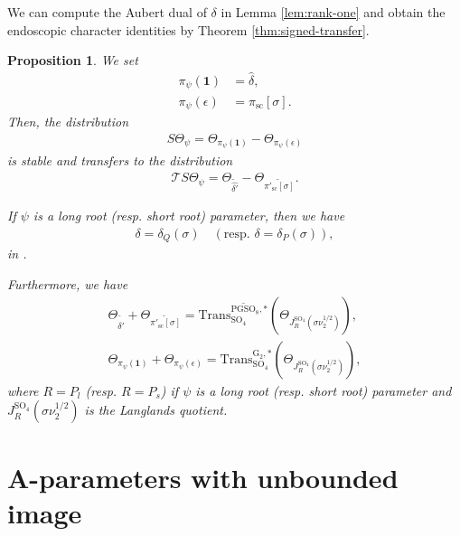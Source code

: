 \documentclass[12pt]{amsart}
\theoremstyle{definition}
\theoremstyle{plain}
\newtheorem{proposition}[definition]{Proposition}
\theoremstyle{remark}
\def\SO{\mathrm{SO}}
\def\PGSO{\mathrm{PGSO}}
\newcommand{\cT}{\mathcal{T}}
\numberwithin{equation}{section}
\newcommand{\rG}{\mathrm{G}}
\newcommand{\Trans}{\mathrm{Trans}}
\begin{document}
We can compute the Aubert dual of $\delta$ in Lemma \ref{lem:rank-one} and obtain the endoscopic character identities by Theorem \ref{thm:signed-transfer}.


\begin{proposition}\label{prop:co-tempered-long-short-ecr}
      We set 
      \begin{align*}
            \pi_{\psi}(\mathbf{1}) &= \widehat{\delta}, \\
            \pi_{\psi}(\epsilon) &= \pi_{\mathrm{sc}}[\sigma].
      \end{align*}
      Then, the distribution
      \begin{align*}
            S\Theta_{\psi} = \Theta_{\pi_{\psi}(\mathbf{1})} - \Theta_{\pi_{\psi}(\epsilon)}
      \end{align*}
      is stable and transfers to the distribution
      \begin{align*}
            \cT S\Theta_{\psi} 
            =
            \Theta_{\widetilde{\widehat{\delta'}}} - \Theta_{\widetilde{\pi'_{\mathrm{sc}}[\sigma]}}.
      \end{align*}

      If $\psi$ is a long root (resp. short root) parameter, then we have
      \begin{align*}
            \delta = \delta_{Q}(\sigma) \quad (\text{resp. } \delta = \delta_{P}(\sigma)),
      \end{align*}
      in \cite{GanSavin2023-HoweDualityDichotomyExceptionalThetaCorrespondences}.

      Furthermore, we have 
      \begin{align*}
            \Theta_{\widetilde{\widehat{\delta'}}} + \Theta_{\widetilde{\pi'_{\mathrm{sc}}[\sigma]}}
            =
            \Trans^{\widetilde{\PGSO_8}, *}_{\SO_4}(\Theta_{J^{\SO_4}_{R}(\sigma \nu_2^{1/2})}), \\
            \Theta_{\pi_{\psi}(\mathbf{1})} + \Theta_{\pi_{\psi}(\epsilon)}
            =
            \Trans^{\rG_2, *}_{\SO_4}(\Theta_{J^{\SO_4}_{R}(\sigma \nu_2^{1/2})}),
      \end{align*}
      where $R = P_{l}$ (resp. $R = P_{s}$) if $\psi$ is a long root (resp. short root) parameter and $J^{\SO_4}_{R}(\sigma \nu_2^{1/2})$ is the Langlands quotient.
\end{proposition}


\section{A-parameters with unbounded image}\label{sec:A-parameter-unbounded-ecr}
\end{document}
